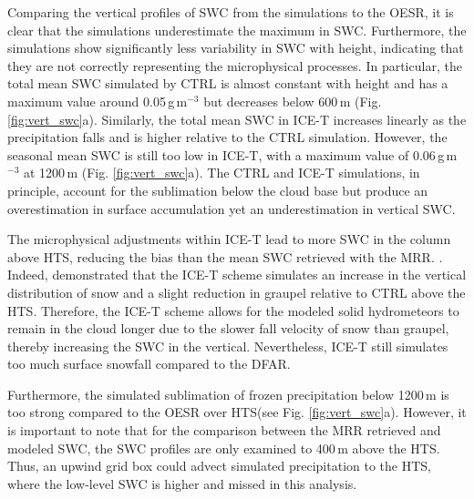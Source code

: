 \documentclass{ametsocV5}
\begin{document}
		Comparing the vertical profiles of SWC from the simulations to the OESR, it is clear that the simulations underestimate the maximum in SWC. Furthermore, the simulations show significantly less variability in SWC with height, indicating that they are not correctly representing the microphysical processes. In particular, the total mean SWC simulated by CTRL is almost constant with height and has a maximum value around 0.05\,g\,m$^{-3}$ but decreases below 600\,m (Fig. \ref{fig:vert_swc}a). Similarly, the total mean SWC in ICE-T increases linearly as the precipitation falls and is higher relative to the CTRL simulation. However, the seasonal mean SWC is still too low in ICE-T, with a maximum value of 0.06\,g\,m$^{-3}$ at 1200\,m (Fig. \ref{fig:vert_swc}a). The CTRL and ICE-T simulations, in principle, account for the sublimation below the cloud base but produce an overestimation in surface accumulation yet an underestimation in vertical SWC. 

		The microphysical adjustments within ICE-T lead to more SWC in the column above HTS, reducing the bias than the mean SWC retrieved with the MRR. \citep{engdahl_effects_2020}. Indeed, \citet{engdahl_effects_2020} demonstrated that the ICE-T scheme simulates an increase in the vertical distribution of snow and a slight reduction in graupel relative to CTRL above the HTS. Therefore, the ICE-T scheme allows for the modeled solid hydrometeors to remain in the cloud longer due to the slower fall velocity of snow than graupel, thereby increasing the SWC in the vertical. Nevertheless, ICE-T still simulates too much surface snowfall compared to the DFAR. 
		
		Furthermore, the simulated sublimation of frozen precipitation below 1200\,m is too strong compared to the OESR over HTS(see Fig. \ref{fig:vert_swc}a). However, it is important to note that for the comparison between the MRR retrieved and modeled SWC, the SWC profiles are only examined to 400\,m above the HTS. Thus, an upwind grid box could advect simulated precipitation to the HTS, where the low-level SWC is higher and missed in this analysis.
\end{document}
